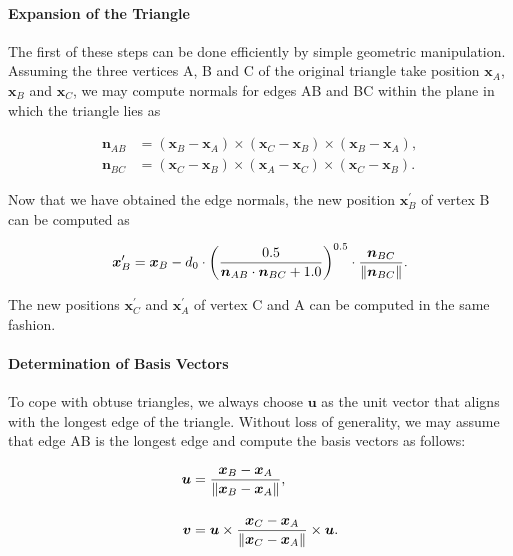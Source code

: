 \documentclass[
	11pt, 
	DIV10,
	ngerman,
	a4paper, 
	oneside, 
	headings=normal, 
	captions=tableheading,
	final, 
	numbers=noenddot
]{scrartcl}
\DeclarePairedDelimiter{\norm}{\lVert}{\rVert}
\begin{document}
\paragraph{Expansion of the Triangle} The first of these steps can be done efficiently by simple geometric manipulation. Assuming the three vertices A, B and C of the original triangle take position $ \boldsymbol{x}_{A} $, $ \boldsymbol{x}_{B} $ and $ \boldsymbol{x}_{C} $, we may compute normals for edges AB and BC within the plane in which the triangle lies as

\begin{equation}
\begin{split}
	\label{eq5}
	\boldsymbol{n}_{AB} &= \left(\boldsymbol{x}_{B} - \boldsymbol{x}_{A}\right) \times \left(\boldsymbol{x}_{C} - \boldsymbol{x}_{B}\right) \times \left(\boldsymbol{x}_{B} - \boldsymbol{x}_{A}\right), \\[1em]
	\boldsymbol{n}_{BC} &= \left(\boldsymbol{x}_{C} - \boldsymbol{x}_{B}\right) \times \left(\boldsymbol{x}_{A} - \boldsymbol{x}_{C}\right) \times \left(\boldsymbol{x}_{C} - \boldsymbol{x}_{B}\right).
\end{split}
\end{equation}

Now that we have obtained the edge normals, the new position $ \boldsymbol{x}_{B}^{\prime} $ of vertex B can be computed as

\begin{equation}
	\label{eq6}
	\boldsymbol{x}_{B}^{\prime} = \boldsymbol{x}_{B} - d_{0} \cdot \left(\frac{0.5}{\boldsymbol{n}_{AB} \cdot \boldsymbol{n}_{BC} + 1.0}\right)^{0.5} \cdot \frac{\boldsymbol{n}_{BC}}{\norm{\boldsymbol{n}_{BC}}}.
\end{equation}

The new positions $ \boldsymbol{x}_{C}^{\prime} $ and $ \boldsymbol{x}_{A}^{\prime} $ of vertex C and A can be computed in the same fashion.

\paragraph{Determination of Basis Vectors} To cope with obtuse triangles, we always choose $ \boldsymbol{u} $ as the unit vector that aligns with the longest edge of the triangle. Without loss of generality, we may assume that edge AB is the longest edge and compute the basis vectors as follows:

\begin{equation}
\begin{split}
	\label{eq7}
	\boldsymbol{u} &= \frac{\boldsymbol{x}_{B} - \boldsymbol{x}_{A}}{\norm{\boldsymbol{x}_{B} - \boldsymbol{x}_{A}}}, \\[1em]
	\boldsymbol{v} &= \boldsymbol{u} \times \frac{\boldsymbol{x}_{C} - \boldsymbol{x}_{A}}{\norm{\boldsymbol{x}_{C} - \boldsymbol{x}_{A}}} \times \boldsymbol{u}.
\end{split}
\end{equation}
\end{document}
